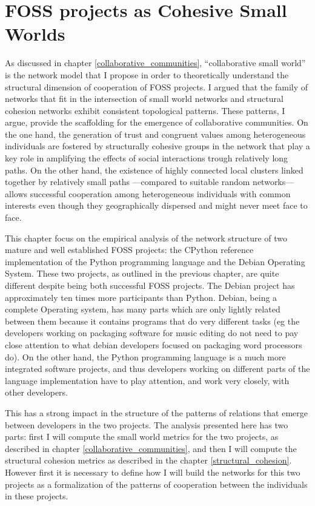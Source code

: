 \chapter{FOSS projects as Cohesive Small Worlds}
\label{cohesive_small_world}

As discussed in chapter \ref{collaborative_communities}, ``collaborative small world'' is the network model that I propose in order to theoretically understand the structural dimension of cooperation of FOSS projects. I argued that the family of networks that fit in the intersection of small world networks and structural cohesion networks exhibit consistent topological patterns. These patterns, I argue, provide the scaffolding for the emergence of collaborative communities. On the one hand, the generation of trust and congruent values among heterogeneous individuals are fostered by structurally cohesive groups in the network that play a key role in amplifying the effects of social interactions trough relatively long paths. On the other hand, the existence of highly connected local clusters linked together by relatively small paths ---compared to suitable random networks--- allows successful cooperation among heterogeneous individuals with common interests even though they geographically dispersed and might never meet face to face.

This chapter focus on the empirical analysis of the network structure of two mature and well established FOSS projects: the CPython reference implementation of the Python programming language and the Debian Operating System. These two projects, as outlined in the previous chapter, are quite different despite being both successful FOSS projects. The Debian project has approximately ten times more participants than Python. Debian, being a complete Operating system, has many parts which are only lightly related between them because it contains programs that do very different tasks (eg the developers working on packaging software for music editing do not need to pay close attention to what debian developers focused on packaging word processors do). On the other hand, the Python programming language is a much more integrated software projects, and thus developers working on different parts of the language implementation have to play attention, and work very closely, with other developers.

This has a strong impact in the structure of the patterns of relations that emerge between developers in the two projects. The analysis presented here has two parts: first I will compute the small world metrics for the two projects, as described in chapter \ref{collaborative_communities}, and then I will compute the structural cohesion metrics as described in the chapter \ref{structural_cohesion}. However first it is necessary to define how I will build the networks for this two projects as a formalization of the patterns of cooperation between the individuals in these projects.

